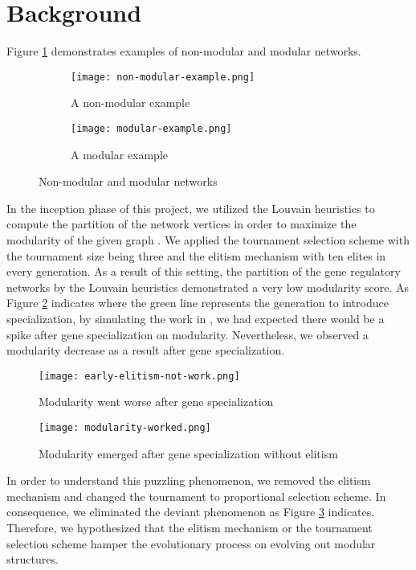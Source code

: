 \section{Background}
Figure \ref{fig:network-example} demonstrates examples of non-modular and modular networks.  
\begin{figure}[h!]
	\centering
	\begin{subfigure}[b]{0.45\linewidth}
		\texttt{[image: non-modular-example.png]}
		\caption{A non-modular example}
	\end{subfigure}
	\begin{subfigure}[b]{0.45\linewidth}
		\texttt{[image: modular-example.png]}
		\caption{A modular example}
	\end{subfigure}
	\caption{Non-modular and modular networks}
	\label{fig:network-example}
\end{figure}
In the inception phase of this project, we utilized the Louvain heuristics to compute the partition of the network vertices in order to maximize the modularity of the given graph \cite{blondel2008fast}. We applied the tournament selection scheme with the tournament size being three and the elitism mechanism with ten elites in every generation. As a result of this setting, the partition of the gene regulatory networks by the Louvain heuristics demonstrated a very low modularity score. As Figure \ref{fig:early-modularity-not-work} indicates where the green line represents the generation to introduce specialization, by simulating the work in \cite{espinosa2010specialization}, we had expected there would be a spike after gene specialization on modularity. Nevertheless, we observed a modularity decrease as a result after gene specialization. 
\begin{figure}[h!]
	\centering
	\texttt{[image: early-elitism-not-work.png]}
	\caption{Modularity went worse after gene specialization}
	\label{fig:early-modularity-not-work}
\end{figure}
\begin{figure}[h!]
	\centering
	\texttt{[image: modularity-worked.png]}
	\caption{Modularity emerged after gene specialization without elitism}
	\label{fig:modularity-worked-without-elitism}
\end{figure}
In order to understand this puzzling phenomenon, we removed the elitism mechanism and changed the tournament to proportional selection scheme. In consequence, we eliminated the deviant phenomenon as Figure \ref{fig:modularity-worked-without-elitism} indicates. Therefore, we hypothesized that the elitism mechanism or the tournament selection scheme hamper the evolutionary process on evolving out modular structures. 

